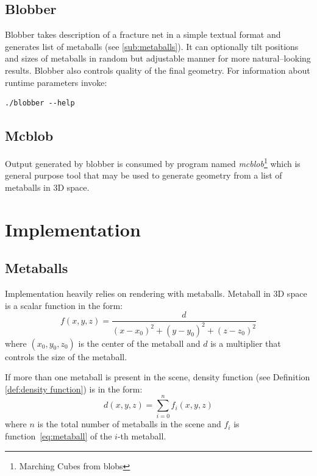 \subsection{Blobber}
Blobber takes description of a fracture net in a simple textual format and
generates list of metaballs (see \autoref{sub:metaballs}). It can
optionally tilt positions and sizes of metaballs in random but adjustable manner
for more natural--looking results. Blobber also controls quality of the final
geometry. For information about runtime parameters invoke:
\begin{verbatim}
./blobber --help
\end{verbatim}

\subsection{Mcblob}
Output generated by blobber is consumed by program named \emph{mcblob}\footnote{Marching
Cubes from blobs} which is general purpose tool that may be used to
generate geometry from a list of metaballs in 3D space.

\section{Implementation}
\subsection{Metaballs}
Implementation heavily relies on rendering with metaballs. Metaball in 3D space
is a scalar function in the form:
\begin{equation}
  f(x,y,z)=\frac{d}{(x-x_0)^2+(y-y_0)^2+(z-z_0)^2}
  \label{eq:metaball}
\end{equation}
where $(x_0,y_0,z_0)$ is the center of the metaball and $d$ is a multiplier that
controls the size of the metaball.

If more than one metaball is present in the scene, density function (see Definition
\autoref{def:density function})
is in the form:
\begin{equation}
  d(x,y,z) = \sum_{i=0}^{n} f_i(x,y,z)
  \label{eq:metaballdensity}
\end{equation}
where $n$ is the total number of metaballs in the scene and $f_i$ is function~\ref{eq:metaball}
of the $i$-th metaball.

